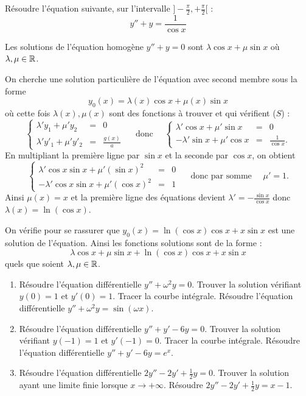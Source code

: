 \documentclass[class=report,crop=false]{standalone}
\begin{document}
\begin{exemple}
Résoudre l'équation suivante, sur l'intervalle $]-\frac\pi2,+\frac\pi2[$ :
$$y'' + y = \frac{1}{\cos x}$$

Les solutions de l'équation homogène $y'' + y =0$ sont
$\lambda \cos x  + \mu \sin x$ où $\lambda,\mu\in\mathbb{R}$.

On cherche une solution particulière de l'équation avec second membre sous la forme
$$y_0(x) =\lambda(x) \cos x  + \mu(x) \sin x$$
où cette fois $\lambda(x),\mu(x)$ sont des fonctions à trouver et qui vérifient ($S$) :
$$
\left\{\begin{array}{ccl}
\lambda'y_1+\mu'y_2&=&0\\
\lambda'y'_1+\mu'y'_2&=& \frac{g(x)}{a}
\end{array}\right.
\quad \text{ donc } \quad
\left\{\begin{array}{ccl}
\lambda' \cos x + \mu' \sin x &=&0\\
-\lambda' \sin x + \mu' \cos x &=& \frac{1}{\cos x}.
\end{array}\right.
$$
En multipliant la première ligne par $\sin x$ et la seconde par $\cos x$, on obtient
$$
\left\{\begin{array}{ccl}
\lambda' \cos x \sin x + \mu' (\sin x)^2 &=&0\\
-\lambda' \cos x \sin x + \mu' (\cos x)^2 &=& 1
\end{array}\right.
\quad \text{ donc par somme } \quad
\mu'=1.
$$
Ainsi $\mu(x) = x$ et la première ligne des équations devient
$\lambda' = -\frac{\sin x}{\cos x}$ donc $\lambda(x) = \ln(\cos x)$.

On vérifie pour se rassurer que $y_0(x) = \ln(\cos x) \cos x + x\sin x$ est une solution
de l'équation. Ainsi les fonctions solutions sont de la forme :
$$\lambda \cos x  + \mu \sin x + \ln(\cos x) \cos x + x\sin x$$
quels que soient $\lambda,\mu\in \mathbb{R}$.

\end{exemple}


\begin{miniexercices}
\sauteligne
\begin{enumerate}
  \item Résoudre l'équation différentielle $y'' + \omega^2y=0$.
  Trouver la solution vérifiant $y(0)=1$ et $y'(0)=1$.
  Tracer la courbe intégrale.
  Résoudre l'équation différentielle $y'' + \omega^2y= \sin(\omega x)$.

  \item Résoudre l'équation différentielle $y'' + y' -6y=0$.
  Trouver la solution vérifiant $y(-1)=1$ et $y'(-1)=0$.
  Tracer la courbe intégrale.
  Résoudre l'équation différentielle $y'' + y' -6y= e^x$.

  \item Résoudre l'équation différentielle $2y'' -2 y' +\frac12 y=0$.
  Trouver la solution ayant une limite finie lorsque $x\to +\infty$.
  Résoudre $2y'' -2 y' +\frac12 y=x-1$.
\end{enumerate}
\end{miniexercices}
\end{document}
